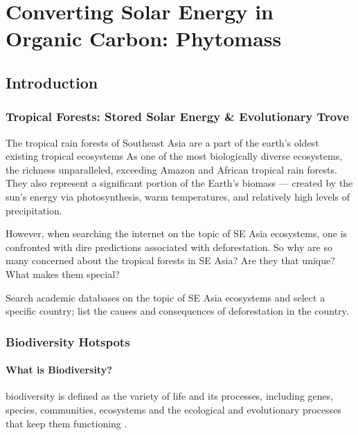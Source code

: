 \chapter{Converting Solar Energy in Organic Carbon: Phytomass}

\section{Introduction}

\subsection{Tropical Forests: Stored Solar Energy \& Evolutionary Trove}

The tropical rain forests of Southeast Asia are a part of the earth's oldest existing tropical ecosystems As one of the most biologically diverse ecosystems, the richness unparalleled, exceeding Amazon and African tropical rain forests. They also represent a significant portion of the Earth's biomass --- created by the sun's energy via photosynthesis, warm temperatures, and relatively high levels of precipitation.

However, when searching the internet on the topic of SE Asia ecosystems, one is confronted with dire predictions associated with deforestation. So why are so many concerned about the tropical forests in SE Asia? Are they that unique? What makes them special?

\begin{exercise}
Search academic databases on the topic of SE Asia ecosystems and select a specific country; list the causes and consequences of deforestation in the country. 
\end{exercise}

\subsection{Biodiversity Hotspots}

\subsubsection{What is Biodiversity?}


\Gls{biodiversity} is defined as the variety of life and its processes, including genes, species, communities, ecosystems and the ecological and evolutionary processes that keep them functioning \citep{noss1994saving}. 
 
